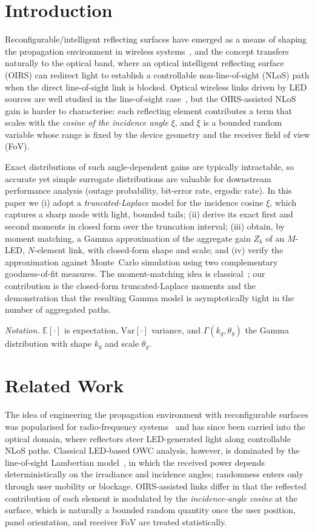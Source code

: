 \documentclass[conference]{IEEEtran}
\begin{document}
\section{Introduction}
Reconfigurable/intelligent reflecting surfaces have emerged as a means of
shaping the propagation environment in wireless systems~\cite{basar2019}, and
the concept transfers naturally to the optical band, where an optical
intelligent reflecting surface (OIRS) can redirect light to establish a
controllable non-line-of-sight (NLoS) path when the direct
line-of-sight link is blocked. Optical wireless links driven by LED
sources are well studied in the line-of-sight case~\cite{komine2004}, but the
OIRS-assisted NLoS gain is harder to characterise: each reflecting element
contributes a term that scales with the \emph{cosine of the incidence angle}
$\xi$, and $\xi$ is a bounded random variable whose range is fixed by the
device geometry and the receiver field of view (FoV).

Exact distributions of such angle-dependent gains are typically intractable,
so accurate yet simple surrogate distributions are valuable for downstream
performance analysis (outage probability, bit-error rate, ergodic rate). In
this paper we (i) adopt a \emph{truncated-Laplace} model for the incidence
cosine $\xi$, which captures a sharp mode with light, bounded tails; (ii)
derive its exact first and second moments in closed form over the truncation
interval; (iii) obtain, by moment matching, a Gamma approximation of the
aggregate gain $Z_k$ of an $M$-LED, $N$-element link, with closed-form shape
and scale; and (iv) verify the approximation against Monte~Carlo simulation
using two complementary goodness-of-fit measures. The moment-matching idea
is classical~\cite{papoulis2002}; our contribution is the closed-form
truncated-Laplace moments and the demonstration that the resulting Gamma
model is asymptotically tight in the number of aggregated paths.

\emph{Notation.} $\mathbb{E}[\cdot]$ is expectation, $\mathrm{Var}[\cdot]$
variance, and $\Gamma(k_g,\theta_g)$ the Gamma distribution with shape
$k_g$ and scale $\theta_g$.

\section{Related Work}
\label{sec:related}
The idea of engineering the propagation environment with reconfigurable
surfaces was popularised for radio-frequency systems~\cite{basar2019} and
has since been carried into the optical domain, where reflectors steer
LED-generated light along controllable NLoS paths. Classical LED-based OWC
analysis, however, is dominated by the line-of-sight Lambertian
model~\cite{komine2004}, in which the received power depends deterministically
on the irradiance and incidence angles; randomness enters only through user
mobility or blockage. OIRS-assisted links differ in that the reflected
contribution of each element is modulated by the \emph{incidence-angle cosine}
at the surface, which is naturally a bounded random quantity once the user
position, panel orientation, and receiver FoV are treated statistically.
\end{document}
